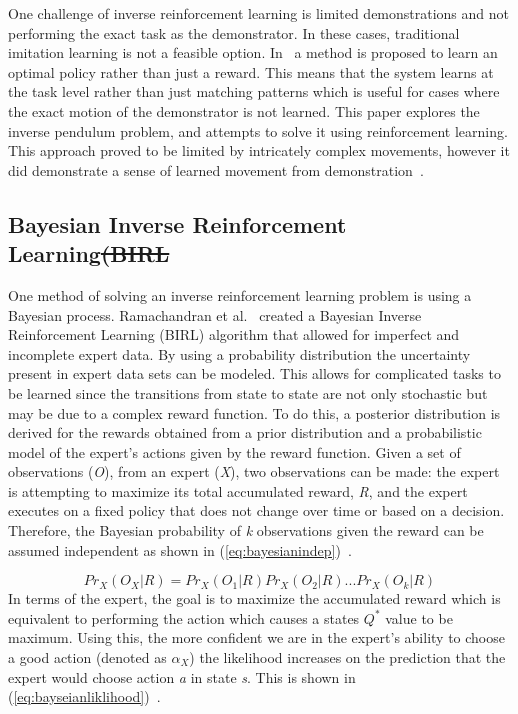 \documentclass[12pt,american]{report}
\providecommand{\DIFdeltex}[1]{{\protect\color{red}\sout{#1}}}                      %
\providecommand{\DIFdelbegin}{} %
\providecommand{\DIFdelend}{} %
\providecommand{\DIFdel}[1]{\texorpdfstring{\DIFdeltex{#1}}{}} %
\newcommand{\DIFscaledelfig}{0.5}
\newlength{\DIFdelgraphicswidth} %
\newlength{\DIFdelgraphicsheight} %
\newcommand{\DIFdelincludegraphics}[2][]{%
\sbox{\DIFdelgraphicsbox}{\DIFOincludegraphics[#1]{#2}}%
\settoboxwidth{\DIFdelgraphicswidth}{\DIFdelgraphicsbox} %
\settoboxtotalheight{\DIFdelgraphicsheight}{\DIFdelgraphicsbox} %
\scalebox{\DIFscaledelfig}{%
\parbox[b]{\DIFdelgraphicswidth}{\usebox{\DIFdelgraphicsbox}\\[-\baselineskip] \rule{\DIFdelgraphicswidth}{0em}}\llap{\resizebox{\DIFdelgraphicswidth}{\DIFdelgraphicsheight}{%
\setlength{\unitlength}{\DIFdelgraphicswidth}%
\begin{picture}(1,1)%
\thicklines\linethickness{2pt} %
{\color[rgb]{1,0,0}\put(0,0){\framebox(1,1){}}}%
{\color[rgb]{1,0,0}\put(0,0){\line( 1,1){1}}}%
{\color[rgb]{1,0,0}\put(0,1){\line(1,-1){1}}}%
\end{picture}%
}\hspace*{3pt}}} %
} %
\DeclareRobustCommand{\DIFdelbegin}{\DIFOdelbegin \let\includegraphics\DIFdelincludegraphics} %
\DeclareRobustCommand{\DIFdelend}{\DIFOaddend \let\includegraphics\DIFOincludegraphics} %
\begin{document}
		One challenge of inverse reinforcement learning is limited demonstrations and not performing the exact task as the demonstrator. In these cases, traditional imitation learning is not a feasible option. In~\cite{atkeson1997robot} a method is proposed to learn an optimal policy rather than just a reward. This means that the system learns at the task level rather than just matching patterns which is useful for cases where the exact motion of the demonstrator is not learned. This paper explores the inverse pendulum problem, and attempts to solve it using reinforcement learning. This approach proved to be limited by intricately complex movements, however it did demonstrate a sense of learned movement from demonstration~\cite{atkeson1997robot}.

\subsection{Bayesian Inverse Reinforcement Learning\DIFdelbegin \DIFdel{(BIRL}\DIFdelend }
One method of solving an inverse reinforcement learning problem is using a Bayesian process. Ramachandran et al.~\cite{ramachandran2007bayesian} created a Bayesian Inverse Reinforcement Learning (BIRL) algorithm that allowed for imperfect and incomplete expert data.  By using a probability distribution the uncertainty present in expert data sets can be modeled. This allows for complicated tasks to be learned since the transitions from state to state are not only stochastic but may be due to a complex reward function. To do this, a posterior distribution is derived for the rewards obtained from a prior distribution and a probabilistic model of the expert's actions given by the reward function.  Given a set of observations (\textit{O}), from an expert (\textit{X}), two observations can be made: the expert is attempting to maximize its total accumulated reward, \textit{R}, and the expert executes on a fixed policy that does not change over time or based on a decision. Therefore, the Bayesian probability of \textit{k} observations given the reward can be assumed independent as shown in (\ref{eq:bayesianindep})~\cite{ramachandran2007bayesian}.

\begin{equation}
            \label{eq:bayesianindep}
            Pr_X(O_X|R) = Pr_X(O_1|R)Pr_X(O_2|R)...Pr_X(O_k|R)%
        \end{equation}
In terms of the expert, the goal is to maximize the accumulated reward which is equivalent to performing the action which causes a states \textit{$Q^*$} value to be maximum. Using this, the more confident we are in the expert's ability to choose a good action (denoted as $\alpha_X$) the likelihood increases on the prediction that the expert would choose action \textit{a} in state \textit{s}.  This is shown in (\ref{eq:bayseianliklihood})~\cite{ramachandran2007bayesian}.
\end{document}
